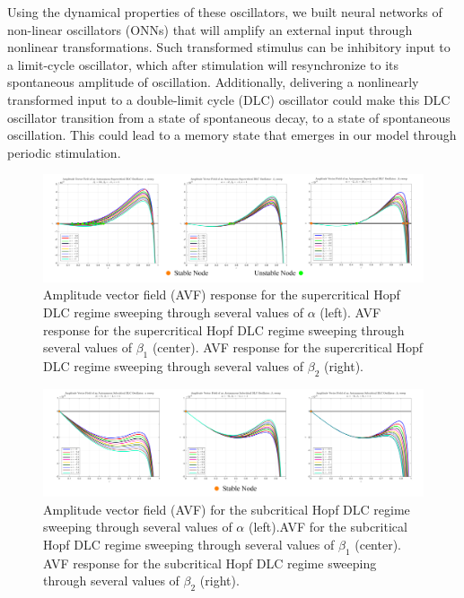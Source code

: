 \documentclass{article}
\begin{document}
Using the dynamical properties of these oscillators, we built neural networks of non-linear oscillators (ONNs) that will amplify an external input through nonlinear transformations. Such transformed stimulus can be inhibitory input to a limit-cycle oscillator, which after stimulation will resynchronize to its spontaneous amplitude of oscillation. Additionally, delivering a nonlinearly transformed input to a double-limit cycle (DLC) oscillator could make this DLC oscillator transition from a state of spontaneous decay, to a state of spontaneous oscillation. This could lead to a memory state that emerges in our model through periodic stimulation. 

\begin{figure}[t]
  \centering
  \hspace*{-0.75cm}   
  \includegraphics[scale=0.13]{superCritical_DLC.png}
  \caption{Amplitude vector field (AVF) response for the supercritical Hopf DLC regime sweeping through several values of $\alpha$ (left). AVF response for the supercritical Hopf DLC regime sweeping through several values of $\beta_1$ (center). AVF response for the supercritical Hopf DLC regime sweeping through several values of $\beta_2$ (right).} 
  \label{fig:superDLC}
\end{figure}
\begin{figure}[b]
  \centering
  \hspace*{-0.75cm}   
  \includegraphics[scale=0.13]{subCritical_DLC.png}
  \caption{Amplitude vector field (AVF) for the subcritical Hopf DLC regime sweeping through several values of $\alpha$ (left).AVF for the subcritical Hopf DLC regime sweeping through several values of $\beta_1$ (center). AVF response for the subcritical Hopf DLC regime sweeping through several values of $\beta_2$ (right).}
  \label{fig:subDLC}
\end{figure}
\end{document}
